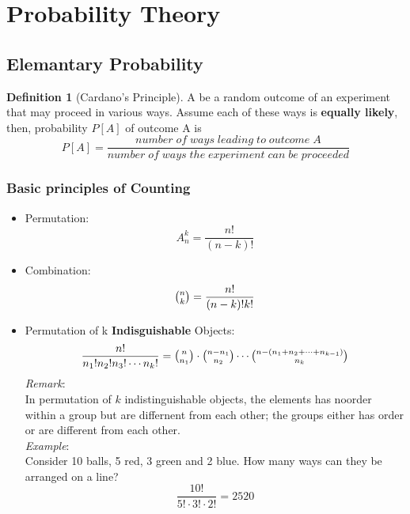 \documentclass{article}
\theoremstyle{definition}
\newtheorem{definition}{Definition}[subsection]
\begin{document}
\section{Probability Theory}
\subsection{Elemantary Probability}
\begin{definition}[Cardano's Principle]
    A be a random outcome of an experiment that may proceed in various ways.
    Assume each of these ways is \textbf{equally likely}, then, probability $P[ A]$ of outcome A is
    \begin{equation}
        P[A] = \frac{number\; of\; ways\; leading\; to\; outcome\; A}{number\; of\; ways\; the\; experiment\; can\; be\; proceeded}
    \end{equation}
\end{definition}
\subsubsection{Basic principles of Counting}
\begin{itemize}
    \item Permutation:
        \begin{equation}
            A_n^k = \frac{n!}{(n-k)!}
        \end{equation}
    \item Combination:
        \begin{equation}
            \tbinom{n}{k}=\frac{n!}{(n-k)!k!}
        \end{equation}
    \item Permutation of k \textbf{Indisguishable} Objects:
        \begin{equation}
            \frac{n!}{n_1!n_2!n_3!\dotsm n_k!}=\tbinom{n}{n_1}\cdot \tbinom{n-n_1}{n_2} \dotsm \tbinom{n-(n_1+n_2 + \dotsm + n_{k-1})}{n_k}
        \end{equation}
        \emph{Remark}:\\ 
        In permutation of $k$ indistinguishable objects, the elements has noorder within a group but are differnent from each other; the groups either has order or are different from each other.\\
        \emph{Example}:\\
        Consider 10 balls, 5 red, 3 green and 2 blue. How many ways can they be arranged on a line?
        \begin{equation}
            \frac{10!}{5! \cdot 3! \cdot 2!} = 2520
        \end{equation}
\end{itemize}
\end{document}
